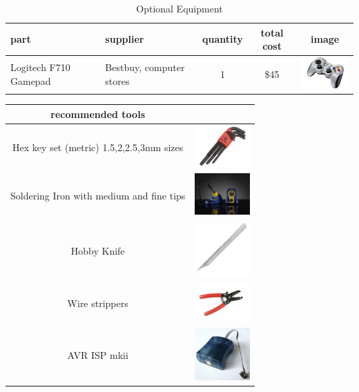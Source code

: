 \documentclass[12pt,titlepage,oneside]{memoir}
\begin{document}
\begin{table}[!h]
\begin{tabular}{p{4cm} | p{3.5cm} | c | c | c}
part & supplier &  quantity &   total cost & image\\
\hline
Logitech F710 Gamepad & Bestbuy, computer stores & 1  & \$45 & \includegraphics[width=80px]{picture/f710.png}\\
\end{tabular}
\caption{Optional Equipment}
\label{table:opBOM}
\end{table}

\begin{table}[!h]
\begin{tabular}{c | c}
\hline
recommended tools & \\
\hline
Hex key set (metric) 1.5,2,2.5,3mm sizes & \includegraphics[width=80px]{picture/hexkey.jpg}\\
Soldering Iron with medium and fine tips & \includegraphics[width=80px]{picture/solderingiron.jpg}\\
Hobby Knife & \includegraphics[width=80px]{picture/knife.jpg}\\
Wire strippers & \includegraphics[width=80px]{picture/wirestripper.jpg}\\
AVR ISP mkii & \includegraphics[width=80px]{picture/avrisp.jpg}\\

\end{tabular}
\end{table}
\end{document}
